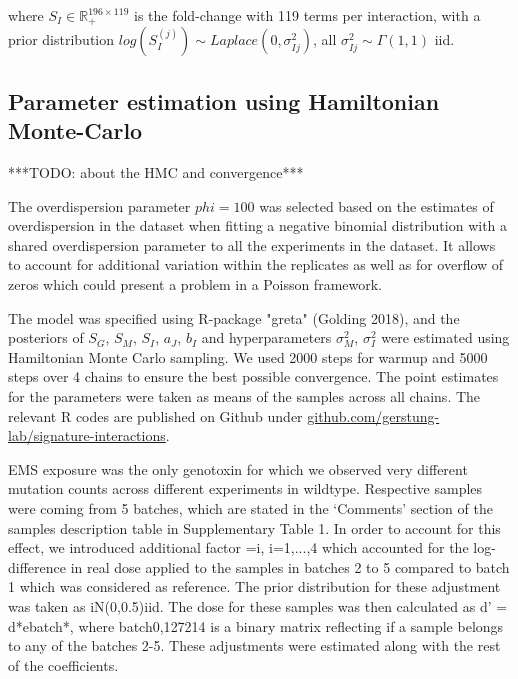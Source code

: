 where $S_{I} \in \mathbb{R}_{+}^{196 \times 119}$ is the fold-change 
with 119 terms per interaction, with a prior distribution 
$log(S_I^{(j)}) \sim Laplace(0, \sigma_{Ij}^{2})$, all $\sigma_{Ij}^{2} \sim \Gamma(1,1)$ iid.

\subsection{Parameter estimation using Hamiltonian Monte-Carlo}

***TODO: about the HMC and convergence***

The overdispersion parameter $phi=100$ was selected based on the estimates of overdispersion in the dataset when fitting a negative binomial distribution with a shared overdispersion parameter to all the experiments in the dataset. It allows to account for additional variation within the replicates as well as for overflow of zeros which could present a problem in a Poisson framework.

The model was specified using R-package "greta" (Golding 2018), and the posteriors of $S_{G}$, $S_{M}$, $S_{I}$, $a_{J}$, $b_{I}$ and hyperparameters $\sigma^{2}_{M}$, $\sigma_{I}^{2}$ were estimated using Hamiltonian Monte Carlo sampling. We used 2000 steps for warmup and 5000 steps over 4 chains to ensure the best possible convergence. The point estimates for the parameters were taken as means of the samples across all chains. The relevant R codes are published on Github under \url{github.com/gerstung-lab/signature-interactions}.

EMS exposure was the only genotoxin for which we observed very different mutation counts across different experiments in wildtype. Respective samples were coming from 5 batches, which are stated in the ‘Comments’ section of the samples description table in Supplementary Table 1. In order to account for this effect, we introduced additional factor ={i}, i=1,...,4 which accounted for the log-difference in real dose applied to the samples in batches 2 to 5 compared to batch 1 which was considered as reference. The prior distribution for these adjustment was taken as iN(0,0.5)iid.  The dose for these samples was then calculated as d' = d*ebatch*, where batch{0,1}27214 is a binary matrix reflecting if a sample belongs to any of the batches 2-5. These adjustments were estimated along with the rest of the coefficients.

